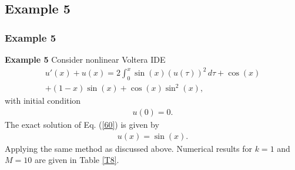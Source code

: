 \documentclass{beamer}
\begin{document}
\subsection*{Example 5}
\begin{frame}\frametitle{Example 5}
	\justifying
\textbf{Example 5} Consider nonlinear Voltera IDE \cite{imran2}
\begin{eqnarray}\label{60}
u'(x)+u(x)=2\int^x_0\sin(x)(u(\tau))^{2}\,d\tau+\cos(x)\nonumber\\+(1-x)\sin(x)+\cos(x)\sin^{2}(x),
\end{eqnarray}
\small
with initial condition
\begin{eqnarray}\label{61}
u(0)=0.
\end{eqnarray}
\small
The exact solution of Eq. (\ref{60}) is given by \cite{imran2}
\begin{eqnarray}\label{62}
u(x)=\sin(x).
\end{eqnarray}
\small
Applying the same method as discussed above. Numerical results for $k=1$ and $M=10$ are given in Table \ref{T8}.
\end{frame}
\end{document}
